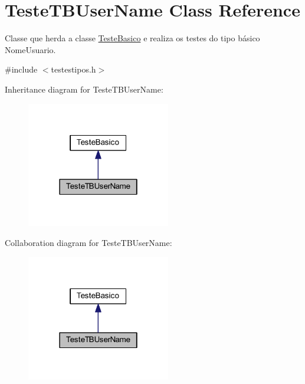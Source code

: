 \hypertarget{class_teste_t_b_user_name}{\section{Teste\-T\-B\-User\-Name Class Reference}
\label{class_teste_t_b_user_name}
}


Classe que herda a classe \hyperlink{class_teste_basico}{Teste\-Basico} e realiza os testes do tipo básico Nome\-Usuario.  




{\ttfamily \#include $<$testestipos.\-h$>$}



Inheritance diagram for Teste\-T\-B\-User\-Name\-:\nopagebreak
\begin{figure}[H]
\begin{center}
\leavevmode
\includegraphics[width=178pt]{class_teste_t_b_user_name__inherit__graph}
\end{center}
\end{figure}


Collaboration diagram for Teste\-T\-B\-User\-Name\-:\nopagebreak
\begin{figure}[H]
\begin{center}
\leavevmode
\includegraphics[width=178pt]{class_teste_t_b_user_name__coll__graph}
\end{center}
\end{figure}
